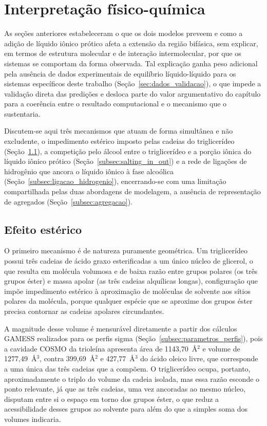 \section{Interpretação físico-química}
\label{sec:interpretacao_fisicoquimica}

As seções anteriores estabeleceram o que os dois modelos preveem e como a adição de líquido iônico prótico afeta a extensão da região bifásica, sem explicar, em termos de estrutura molecular e de interação intermolecular, por que os sistemas se comportam da forma observada. Tal explicação ganha peso adicional pela ausência de dados experimentais de equilíbrio líquido-líquido para os sistemas específicos deste trabalho (Seção~\ref{sec:dados_validacao}), o que impede a validação direta das predições e desloca parte do valor argumentativo do capítulo para a coerência entre o resultado computacional e o mecanismo que o sustentaria.

Discutem-se aqui três mecanismos que atuam de forma simultânea e não excludente, o impedimento estérico imposto pelas cadeias do triglicerídeo (Seção~\ref{subsec:efeito_esterico}), a competição pelo álcool entre o triglicerídeo e a porção iônica do líquido iônico prótico (Seção~\ref{subsec:salting_in_out}) e a rede de ligações de hidrogênio que ancora o líquido iônico à fase alcoólica (Seção~\ref{subsec:ligacao_hidrogenio}), encerrando-se com uma limitação compartilhada pelas duas abordagens de modelagem, a ausência de representação de agregados (Seção~\ref{subsec:agregacao}).

\subsection{Efeito estérico}
\label{subsec:efeito_esterico}

O primeiro mecanismo é de natureza puramente geométrica. Um triglicerídeo possui três cadeias de ácido graxo esterificadas a um único núcleo de glicerol, o que resulta em molécula volumosa e de baixa razão entre grupos polares (os três grupos éster) e massa apolar (as três cadeias alquílicas longas), configuração que impõe impedimento estérico à aproximação de moléculas de solvente aos sítios polares da molécula, porque qualquer espécie que se aproxime dos grupos éster precisa contornar as cadeias apolares circundantes.

A magnitude desse volume é mensurável diretamente a partir dos cálculos GAMESS realizados para os perfis sigma (Seção~\ref{subsec:parametros_perfis}), pois a cavidade COSMO da trioleína apresenta área de 1143,70~\AA$^2$ e volume de 1277,49~\AA$^3$, contra 399,69~\AA$^2$ e 427,77~\AA$^3$ do ácido oleico livre, que corresponde a uma única das três cadeias que a compõem. O triglicerídeo ocupa, portanto, aproximadamente o triplo do volume da cadeia isolada, mas essa razão esconde o ponto relevante, já que as três cadeias, uma vez ancoradas ao mesmo núcleo, disputam entre si o espaço em torno dos grupos éster, o que reduz a acessibilidade desses grupos ao solvente para além do que a simples soma dos volumes indicaria.


